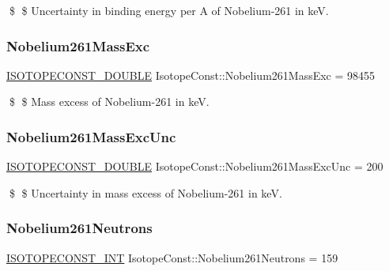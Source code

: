 \$ \$ Uncertainty in binding energy per A of Nobelium-\/261 in keV. \mbox{\label{group___isotope_const-_nobelium-_no261_gaed40d2a16e3b81f757f1f58cdd679e8d}} 
\subsubsection{\texorpdfstring{Nobelium261\+Mass\+Exc}{Nobelium261MassExc}}
{\footnotesize\ttfamily \mbox{\hyperlink{group___isotope_const-_macros_ga8f45a7272ce02c0b4c65c44636ed719a}{I\+S\+O\+T\+O\+P\+E\+C\+O\+N\+S\+T\+\_\+\+D\+O\+U\+B\+LE}} Isotope\+Const\+::\+Nobelium261\+Mass\+Exc = 98455}

\$ \$ Mass excess of Nobelium-\/261 in keV. \mbox{\label{group___isotope_const-_nobelium-_no261_ga82c75b4da1130b002c5e202aa65e85e0}} 
\subsubsection{\texorpdfstring{Nobelium261\+Mass\+Exc\+Unc}{Nobelium261MassExcUnc}}
{\footnotesize\ttfamily \mbox{\hyperlink{group___isotope_const-_macros_ga8f45a7272ce02c0b4c65c44636ed719a}{I\+S\+O\+T\+O\+P\+E\+C\+O\+N\+S\+T\+\_\+\+D\+O\+U\+B\+LE}} Isotope\+Const\+::\+Nobelium261\+Mass\+Exc\+Unc = 200}

\$ \$ Uncertainty in mass excess of Nobelium-\/261 in keV. \mbox{\label{group___isotope_const-_nobelium-_no261_ga81963f60745cb2d95fb7c39a3446cdee}} 
\subsubsection{\texorpdfstring{Nobelium261\+Neutrons}{Nobelium261Neutrons}}
{\footnotesize\ttfamily \mbox{\hyperlink{group___isotope_const-_macros_ga5f18360b3e99483a35c32d789e62621c}{I\+S\+O\+T\+O\+P\+E\+C\+O\+N\+S\+T\+\_\+\+I\+NT}} Isotope\+Const\+::\+Nobelium261\+Neutrons = 159}

